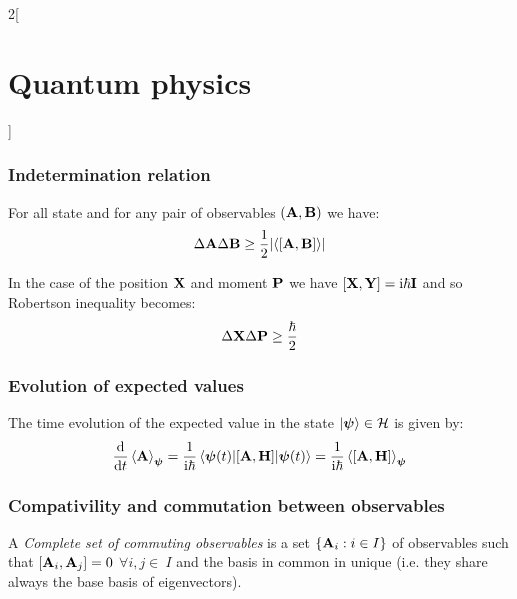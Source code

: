 \documentclass[../../../main_physics.tex]{subfiles}
\begin{document}
\begin{multicols}{2}[\section{Quantum physics}]
  \subsubsection{Indetermination relation}
  \begin{theorem}
    For all state and for any pair of observables $(\boldsymbol{\mathrm{A}},\boldsymbol{\mathrm{B}})$ we have: $$\Delta\vf{A}\Delta\vf{B}\geq \frac{1}{2}\abs{\langle\comm{\vf{A}}{\vf{B}}\rangle}$$
  \end{theorem}
  \begin{corollary}
    In the case of the position $\boldsymbol{\mathrm{X}}$ and moment $\boldsymbol{\mathrm{P}}$ we have $\comm{\vf{X}}{\vf{Y}}=\ii \hbar\vf{I}$ and so Robertson inequality becomes: $$\Delta\boldsymbol{\mathrm{X}}\Delta\boldsymbol{\mathrm{P}}\geq \frac{\hbar}{2}$$
  \end{corollary}
  \subsubsection{Evolution of expected values}
  \begin{proposition}
    The time evolution of the expected value in the state $\ket{\boldsymbol{\mathrm{\psi}}}\in\mathcal{H}$ is given by:
    $$\dv{}{t}\ev{\vf{A}}_{\vf\psi}=\frac{1}{\ii\hbar}\ev{\comm{\vf{A}}{\vf{H}}}{\vf\psi(t)}=\frac{1}{\ii\hbar}\ev{\comm{\vf{A}}{\vf{H}}}_{\vf\psi}$$
  \end{proposition}
  \subsubsection{Compativility and commutation between observables}
  \begin{definition}
    A \emph{Complete set of commuting observables} is a set $\{\boldsymbol{\mathrm{A}}_i:i\in I\}$ of observables such that $\comm{\vf{A}_i}{\vf{A}_j}=0$ $\forall i,j\in\ I$ and the basis in common in unique (i.e. they share always the base basis of eigenvectors).
  \end{definition}

\end{multicols}
\end{document}
